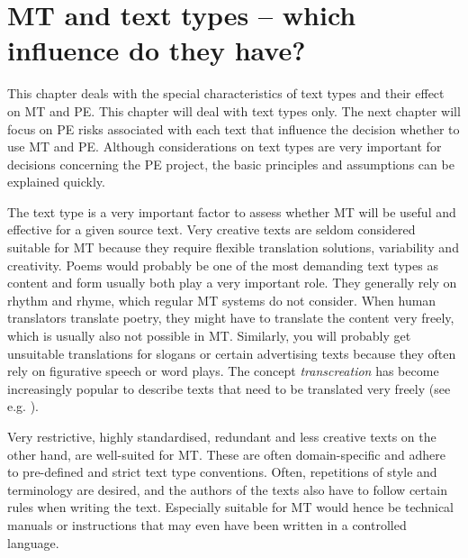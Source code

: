 \chapter{MT and text types -- which influence do they have?}\label{sec:5}



\vspace{\baselineskip}

This chapter deals with the special characteristics of text types and their effect on MT and PE. This chapter will deal with text types only. The next chapter will focus on PE risks associated with each text that influence the decision whether to use MT and PE. Although considerations on text types are very important for decisions concerning the PE project, the basic principles and assumptions can be explained quickly.


The text type is a very important factor to assess whether MT will be useful and effective for a given source text. Very creative texts are seldom considered suitable for MT because they require flexible translation solutions, variability and creativity. Poems would probably be one of the most demanding text types as content and form usually both play a very important role. They generally rely on rhythm and rhyme, which regular MT systems do not consider. When human translators translate poetry, they might have to translate the content very freely, which is usually also not possible in MT. Similarly, you will probably get unsuitable translations for slogans or certain advertising texts because they often rely on figurative speech or word plays. The concept \textit{transcreation} has become increasingly popular to describe texts that need to be translated very freely (see e.g. \citealt{pedersen2014exploring}).

Very restrictive, highly standardised, redundant and less creative texts on the other hand, are well-suited for MT. These are often domain-specific and adhere to pre-defined and strict text type conventions. Often, repetitions of style and terminology are desired, and the authors of the texts also have to follow certain rules when writing the text. Especially suitable for MT would hence be technical manuals or instructions that may even have been written in a controlled language. 


